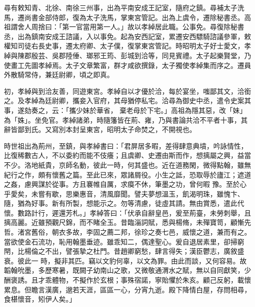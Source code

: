 \begin{pinyinscope}
 尋有敕知青、北徐、南徐三州事，出為平南安成王記室，隨府之鎮。尋補太子洗馬，遷尚書金部侍郎，復為太子洗馬，掌東宮管記。出為上虞令，遷除秘書丞。高祖謂舍人周捨曰：「第一官當用第一人。」故以孝綽居此職。公事免。尋復除秘書
 丞，出為鎮南安成王諮議，入以事免。起為安西記室，累遷安西驃騎諮議參軍，敕權知司徒右長史事，遷太府卿、太子僕，復掌東宮管記。時昭明太子好士愛文，孝綽與陳郡殷芸、吳郡陸倕、瑯邪王筠、彭城到洽等，同見賓禮。太子起樂賢堂，乃使畫工先圖孝綽焉。太子文章繁富，群才咸欲撰錄，太子獨使孝綽集而序之。遷員外散騎常侍，兼廷尉卿，頃之即真。



 初，孝綽與到洽友善，同遊東宮。孝綽自以才優於洽，每於宴坐，嗤鄙其文，洽銜之。及孝綽為廷尉卿，攜妾入官府，其母猶停私宅。洽尋為御史中丞，遣令史案其事，遂劾奏之，云：「攜少妹於華省，
 棄老母於下宅。」高祖為隱其惡，改「妹」為「姝」。坐免官。孝綽諸弟，時隨籓皆在荊、雍，乃與書論共洽不平者十事，其辭皆鄙到氏。又寫別本封呈東宮，昭明太子命焚之，不開視也。



 時世祖出為荊州，至鎮，與孝綽書曰：「君屏居多暇，差得肆意典墳，吟詠情性，比復稀數古人，不以委約而能不伎癢；且虞卿、史遷由斯而作，想摛屬之興，益當不少。洛地紙貴，京師名動，彼此一時，何其盛也。近在道務閑，微得點翰，雖無紀行之作，頗有懷舊之篇。至此已來，眾諸屑役。小生之詆，恐取辱於廬江；遮道之姦，慮興謀於從事。方且褰帷自厲，求瘼不休，筆墨之功，曾何暇
 豫。至於心乎愛矣，未嘗有歇，思樂惠音，清風靡聞。譬夫夢想溫玉，飢渴明珠，雖愧卞、隨，猶為好事。新有所製，想能示之。勿等清慮，徒虛其請。無由賞悉，遣此代懷。數路計行，遲還芳札。」孝綽答曰：「伏承自辭皇邑，爰至荊臺，未勞刺舉，且摛高麗。近雖預觀尺錦，而不睹全玉。昔臨淄詞賦，悉與楊脩，未殫寶笥，顧慚先哲。渚宮舊俗，朝衣多故，李固之薦二邦，徐珍之奏七邑，威懷之道，兼而有之。當欲使金石流功，恥用翰墨垂迹。雖乖知二，偶達聖心。爰自退居素里，卻掃窮閈，比楊倫之不出，譬張摯之杜門。昔趙卿窮愁，肆言得失；漢臣鬱志，廣敘盛衰。彼此一
 時，擬非其匹。竊以文豹何辜，以文為罪。由此而談，又何容易。故韜翰吮墨，多歷寒暑，既闕子幼南山之歌，又微敬通渭水之賦，無以自同獻笑，少酬褒誘。且才乖體物，不擬作於玄根；事殊宿諾，寧貽懼於朱亥。顧己反躬，載懷累息。但瞻言漢廣，邈若天涯，區區一心，分宵九逝。殿下降情白屋，存問相尋，食椹懷音，矧伊人矣。」




\end{pinyinscope}
